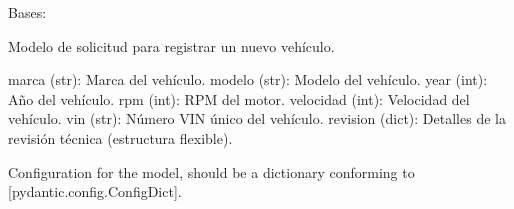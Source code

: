 \documentclass[letterpaper,10pt,spanish]{sphinxmanual}
\begin{document}
\begin{fulllineitems}
\label{\detokenize{modelos:main.VehiculoRegistro}}
\pysigstartsignatures
\pysiglinewithargsret
{}
{\sphinxparamcomma {}\sphinxparamcomma {}\sphinxparamcomma {}\sphinxparamcomma {}\sphinxparamcomma {}\sphinxparamcomma {}\sphinxparamcomma {}}
{}
\pysigstopsignatures
\sphinxAtStartPar
Bases: 

\sphinxAtStartPar
Modelo de solicitud para registrar un nuevo vehículo.
\begin{description}
\sphinxAtStartPar
marca (str): Marca del vehículo.
modelo (str): Modelo del vehículo.
year (int): Año del vehículo.
rpm (int): RPM del motor.
velocidad (int): Velocidad del vehículo.
vin (str): Número VIN único del vehículo.
revision (dict): Detalles de la revisión técnica (estructura flexible).

\end{description}

\begin{fulllineitems}
\label{\detokenize{modelos:main.VehiculoRegistro.model_config}}
\pysigstartsignatures
\pysigline
{}
\pysigstopsignatures
\sphinxAtStartPar
Configuration for the model, should be a dictionary conforming to {[}\sphinxtitleref{ConfigDict}{]}{[}pydantic.config.ConfigDict{]}.

\end{fulllineitems}


\end{fulllineitems}
\end{document}
